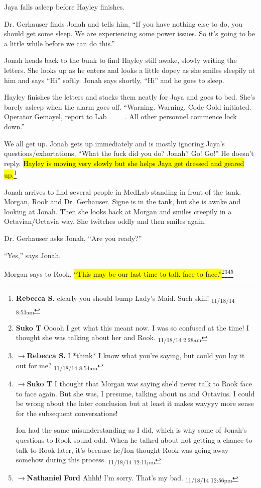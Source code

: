 Jaya falls asleep before Hayley finishes.



Dr. Gerhauser finds Jonah and tells him, ``If you have nothing else to do, you should get some sleep.  We are experiencing some power issues.  So it's going to be a little while before we can do this.''



Jonah heads back to the bunk to find Hayley still awake, slowly writing the letters.  She looks up as he enters and looks a little dopey as she smiles sleepily at him and says ``Hi'' softly.  Jonah says shortly, ``Hi'' and he goes to sleep.



Hayley finishes the letters and stacks them neatly for Jaya and goes to bed.  She's barely asleep when the alarm goes off.  ``Warning. Warning.  Code Gold initiated.  Operator Gemayel, report to Lab \_\_\_.  All other personnel commence lock down.''



We all get up.  Jonah gets up immediately and is mostly ignoring Jaya's questions/exhortations, ``What the fuck did you do?  Jonah?  Go!  Go!''  He doesn't reply.  \hl{Hayley is moving very slowly but she helps Jaya get dressed and geared up.}\footnote{\textbf{Rebecca S. }clearly you should bump Lady's Maid. Such skill! \textsubscript{11/18/14 8:53am}}





Jonah arrives to find several people in MedLab standing in front of the tank.  Morgan, Rook and Dr. Gerhauser.  Signe is in the tank, but she is awake and looking at Jonah.  Then she looks back at Morgan and smiles creepily in a Octavian/Octavia way.  She twitches oddly and then smiles again.  

Dr. Gerhauser asks Jonah, ``Are you ready?''

``Yes,'' says Jonah.

Morgan says to Rook, \hl{``This may be our last time to talk face to face.''}\footnote{\textbf{Suko T }Ooooh I get what this meant now.  I was so confused at the time!  I thought she was talking about her and Rook. \textsubscript{11/18/14 2:28am}}\footnote{$\rightarrow$\textbf{Rebecca S. }I *think* I know what you're saying, but could you lay it out for me? \textsubscript{11/18/14 8:54am}}\footnote{$\rightarrow$\textbf{Suko T }I thought that Morgan was saying she'd never talk to Rook face to face again. But she was, I presume, talking about us and Octavius.  I could be wrong about the later conclusion but at least it makes wayyyy more sense for the subsequent conversations!  

Ion had the same misunderstanding as I did, which is why some of Jonah's questions to Rook sound odd.  When he talked about not getting a chance to talk to Rook later, it's because he/Ion thought Rook was going away somehow during this process. \textsubscript{11/18/14 12:11pm}}\footnote{$\rightarrow$\textbf{Nathaniel Ford }Ahhh! I'm sorry. That's my bad. \textsubscript{11/18/14 12:56pm}}

